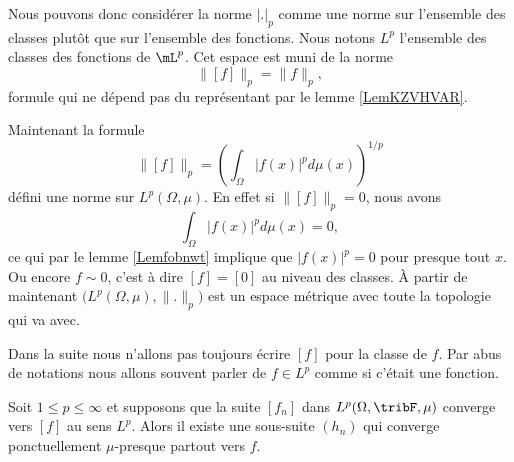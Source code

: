 Nous pouvons donc considérer la norme \( | . |_p\) comme une norme sur l'ensemble des classes plutôt que sur l'ensemble des fonctions. Nous notons \( L^p\) l'ensemble des classes des fonctions de \(\mL^p\). Cet espace est muni de la norme
\begin{equation}
    \| [f] \|_p=\| f \|_p,
\end{equation}
formule qui ne dépend pas du représentant par le lemme \ref{LemKZVHVAR}.

Maintenant la formule
\begin{equation}
    \| [f] \|_p=\left( \int_{\Omega}| f(x) |^pd\mu(x) \right)^{1/p}
\end{equation}
défini une norme sur \( L^p(\Omega,\mu)\). En effet si \( \| [f] \|_p=0\), nous avons
\begin{equation}
    \int_{\Omega}| f(x) |^pd\mu(x)=0,
\end{equation}
ce qui par le lemme \ref{Lemfobnwt} implique que \( | f(x) |^p=0\) pour presque tout \( x\). Ou encore \( f\sim 0\), c'est à dire \( [f]=[0]\) au niveau des classes. À partir de maintenant \( \big( L^p(\Omega,\mu),\| . \|_p \big)\) est un espace métrique avec toute la topologie qui va avec.

Dans la suite nous n'allons pas toujours écrire \( [f]\) pour la classe de \( f\). Par abus de notations nous allons souvent parler de \( f\in L^p\) comme si c'était une fonction.

\begin{proposition}  \label{PropWoywYG}
    Soit \( 1\leq p\leq \infty\) et supposons que la suite \( [f_n]\) dans \( L^p(\Omega,\tribF,\mu)\) converge vers \( [f]\) au sens \( L^p\). Alors il existe une sous-suite \( (h_n)\) qui converge ponctuellement \( \mu\)-presque partout vers \( f\).
\end{proposition}


